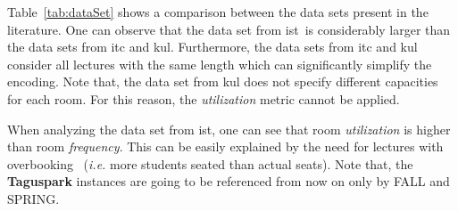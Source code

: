 \documentclass[twocolumn,natbib]{svjour3}          %
\newcommand{\uni}{\gls{ist}}
\begin{document}
\begin{figure*}[!htbp]
  \begin{minipage}{\textwidth}
\label{tab:percentageD}
\begin{subfigure}{.5\textwidth}
    \caption{}
    \label{fig:normalDistStu}
\end{subfigure}
\begin{subfigure}{.5\textwidth}
    \caption{}
    \label{fig:normalDistShift}
\end{subfigure}
\end{minipage}  
\end{figure*}

Table~\ref{tab:dataSet} shows a comparison between the data sets present in the literature. One can observe that the data set from \uni \ is considerably larger than the data sets from \gls{itc} and \gls{kul}. Furthermore, the data sets from \gls{itc} and \gls{kul} consider all lectures with the same length which can significantly simplify the encoding. Note that, the data set from \gls{kul} does not specify different capacities for each room. For this reason, the \textit{utilization} metric cannot be applied.

When analyzing the data set from \uni, one can see that room \textit{utilization} is higher than room \textit{frequency}. This can be easily explained by the need for lectures with overbooking~\citep{LEMOS2018100092} (\emph{i.e.} more students seated than actual seats). Note that, the \textbf{Taguspark} instances are going to be referenced from now on only by \textsc{FALL} and \textsc{SPRING}.
\end{document}
